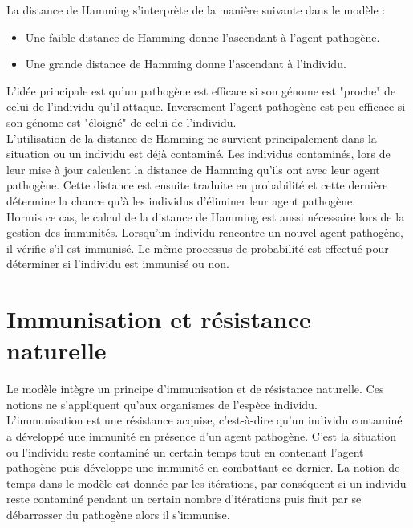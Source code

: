 La distance de Hamming s’interprète de la manière suivante dans le modèle :

\begin{itemize}
	\item Une faible distance de Hamming donne l'ascendant à l'agent pathogène.
	\item Une grande distance de Hamming donne l'ascendant à l'individu.
\end{itemize}

L'idée principale est qu'un pathogène est efficace si son génome est "proche" de celui de l'individu qu'il attaque. Inversement l'agent pathogène est peu efficace si son génome est "éloigné" de celui de l'individu.\\

L'utilisation de la distance de Hamming ne survient principalement dans la situation ou un individu est déjà contaminé. Les individus contaminés, lors de leur mise à jour calculent la distance de Hamming qu'ils ont avec leur agent pathogène. Cette distance est ensuite traduite en probabilité et cette dernière détermine la chance qu'à les individus d'éliminer leur agent pathogène.\\

Hormis ce cas, le calcul de la distance de Hamming est aussi nécessaire lors de la gestion des immunités. Lorsqu'un individu rencontre un nouvel agent pathogène, il vérifie s'il est immunisé. Le même processus de probabilité est effectué pour déterminer si l'individu est immunisé ou non.

\section{Immunisation et résistance naturelle}

Le modèle intègre un principe d'immunisation et de résistance naturelle. Ces notions ne s'appliquent qu'aux organismes de l'espèce individu.\\

L'immunisation est une résistance acquise, c'est-à-dire qu'un individu contaminé a développé une immunité en présence d'un agent pathogène. C'est la situation ou l'individu reste contaminé un certain temps tout en contenant l'agent pathogène puis développe une immunité en combattant ce dernier. La notion de temps dans le modèle est donnée par les itérations, par conséquent si un individu reste contaminé pendant un certain nombre d'itérations puis finit par se débarrasser du pathogène alors il s'immunise.\\

